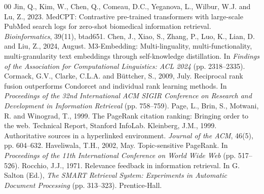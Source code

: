 \documentclass[conference]{IEEEtran}
\begin{document}
\begin{thebibliography}{00}
 Jin, Q., Kim, W., Chen, Q., Comeau, D.C., Yeganova, L., Wilbur, W.J. and Lu, Z., 2023. MedCPT: Contrastive pre-trained transformers with large-scale PubMed search logs for zero-shot biomedical information retrieval. \textit{Bioinformatics}, 39(11), btad651.
 Chen, J., Xiao, S., Zhang, P., Luo, K., Lian, D. and Liu, Z., 2024, August. M3-Embedding: Multi-linguality, multi-functionality, multi-granularity text embeddings through self-knowledge distillation. In \textit{Findings of the Association for Computational Linguistics: ACL 2024} (pp. 2318--2335).
 Cormack, G.V., Clarke, C.L.A. and B\"{u}ttcher, S., 2009, July. Reciprocal rank fusion outperforms Condorcet and individual rank learning methods. In \textit{Proceedings of the 32nd International ACM SIGIR Conference on Research and Development in Information Retrieval} (pp. 758--759).
 Page, L., Brin, S., Motwani, R. and Winograd, T., 1999. The PageRank citation ranking: Bringing order to the web. Technical Report, Stanford InfoLab.
 Kleinberg, J.M., 1999. Authoritative sources in a hyperlinked environment. \textit{Journal of the ACM}, 46(5), pp. 604--632.
 Haveliwala, T.H., 2002, May. Topic-sensitive PageRank. In \textit{Proceedings of the 11th International Conference on World Wide Web} (pp. 517--526).
 Rocchio, J.J., 1971. Relevance feedback in information retrieval. In G. Salton (Ed.), \textit{The SMART Retrieval System: Experiments in Automatic Document Processing} (pp. 313--323). Prentice-Hall.
\end{thebibliography}
\end{document}
